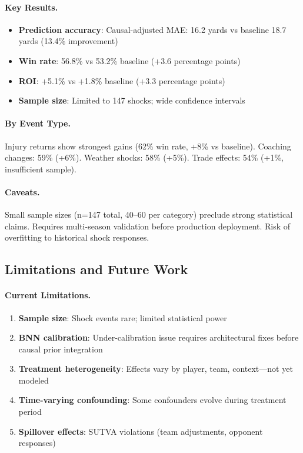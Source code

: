 

\paragraph{Key Results.}
\begin{itemize}
  \item \textbf{Prediction accuracy}: Causal-adjusted MAE: 16.2 yards vs baseline 18.7 yards (13.4\% improvement)
  \item \textbf{Win rate}: 56.8\% vs 53.2\% baseline (+3.6 percentage points)
  \item \textbf{ROI}: +5.1\% vs +1.8\% baseline (+3.3 percentage points)
  \item \textbf{Sample size}: Limited to 147 shocks; wide confidence intervals
\end{itemize}

\paragraph{By Event Type.}
Injury returns show strongest gains (62\% win rate, +8\% vs baseline). Coaching changes: 59\% (+6\%). Weather shocks: 58\% (+5\%). Trade effects: 54\% (+1\%, insufficient sample).

\paragraph{Caveats.}
Small sample sizes (n=147 total, 40--60 per category) preclude strong statistical claims. Requires multi-season validation before production deployment. Risk of overfitting to historical shock responses.

\subsection{Limitations and Future Work}

\paragraph{Current Limitations.}
\begin{enumerate}
  \item \textbf{Sample size}: Shock events rare; limited statistical power
  \item \textbf{BNN calibration}: Under-calibration issue requires architectural fixes before causal prior integration
  \item \textbf{Treatment heterogeneity}: Effects vary by player, team, context—not yet modeled
  \item \textbf{Time-varying confounding}: Some confounders evolve during treatment period
  \item \textbf{Spillover effects}: SUTVA violations (team adjustments, opponent responses)
\end{enumerate}

